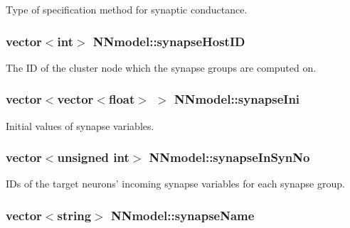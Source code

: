 Type of specification method for synaptic conductance. 

\hypertarget{classNNmodel_acd3b57fb1ab65b46f3d23a7464e4dcf8}{
\subsubsection[{synapse\+Host\+I\+D}]{\setlength{\rightskip}{0pt plus 5cm}vector$<$int$>$ N\+Nmodel\+::synapse\+Host\+I\+D}}\label{classNNmodel_acd3b57fb1ab65b46f3d23a7464e4dcf8}


The I\+D of the cluster node which the synapse groups are computed on. 

\hypertarget{classNNmodel_a0b82703b2b3726e86116767f2bc0c422}{
\subsubsection[{synapse\+Ini}]{\setlength{\rightskip}{0pt plus 5cm}vector$<$vector$<$float$>$ $>$ N\+Nmodel\+::synapse\+Ini}}\label{classNNmodel_a0b82703b2b3726e86116767f2bc0c422}


Initial values of synapse variables. 

\hypertarget{classNNmodel_adc8ccfb003c34fbca10d0fd0e3b26ee0}{
\subsubsection[{synapse\+In\+Syn\+No}]{\setlength{\rightskip}{0pt plus 5cm}vector$<$unsigned int$>$ N\+Nmodel\+::synapse\+In\+Syn\+No}}\label{classNNmodel_adc8ccfb003c34fbca10d0fd0e3b26ee0}


I\+Ds of the target neurons' incoming synapse variables for each synapse group. 

\hypertarget{classNNmodel_a13993564faeb0e67a21b3c9ffababaf1}{
\subsubsection[{synapse\+Name}]{\setlength{\rightskip}{0pt plus 5cm}vector$<$string$>$ N\+Nmodel\+::synapse\+Name}}\label{classNNmodel_a13993564faeb0e67a21b3c9ffababaf1}


